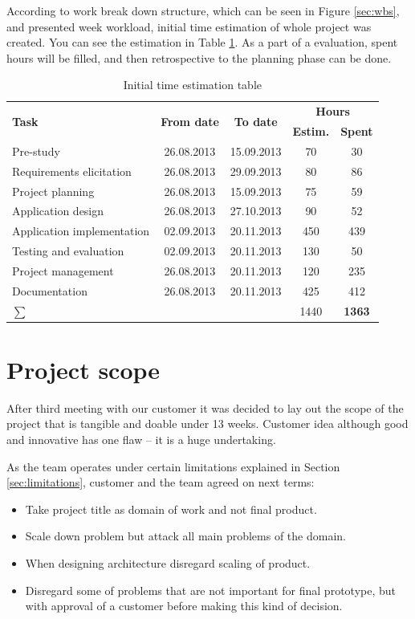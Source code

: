 According to work break down structure, which can be seen in Figure \ref{sec:wbs}, and presented week workload, initial time estimation of whole project was created. 
You can see the estimation in Table \ref{tab:initial-time-estimation}. 
As a part of a evaluation, spent hours will be filled, and then retrospective to the planning phase can be done.

\begin{table}[!h]
	\caption{Initial time estimation table}
	\label{tab:initial-time-estimation}
	\def\arraystretch{1.25}
	\begin{tabularx}{\textwidth}{Xcccc}
		\toprule[0.5mm]
		\multirow{2}{*}{\textbf{Task}} &
		\multirow{2}{*}{\textbf{From date}} & 
		\multirow{2}{*}{\textbf{To date}} & 
		\multicolumn{2}{c}{\textbf{Hours}} \\
 				& & & \textbf{Estim.} & \textbf{Spent} \\
		\midrule
		Pre-study 					& 26.08.2013 & 15.09.2013 & 70 &  30\\
		Requirements elicitation 	& 26.08.2013 & 29.09.2013 & 80 &  86\\
		Project planning			& 26.08.2013 & 15.09.2013 &	75 &  59\\
		Application design 			& 26.08.2013 & 27.10.2013 & 90 &  52\\
		Application implementation	& 02.09.2013 & 20.11.2013 &	450 &  439\\
		Testing and evaluation 		& 02.09.2013 & 20.11.2013 & 130 &	50\\
		Project management  		& 26.08.2013 & 20.11.2013 & 120 &  235\\
		Documentation				& 26.08.2013 & 20.11.2013 &	425 &  412\\
		\midrule		
		\textbf{$\sum$}	& &	&		1440	& \textbf{1363} \\								
		\bottomrule[0.5mm]
	\end{tabularx}
\end{table}


\section{Project scope}
After third meeting with our customer it was decided to lay out the scope of the project that is tangible and doable under 13 weeks. Customer idea although good and innovative has one flaw -- it is a huge undertaking.

As the team operates under certain limitations explained in Section \ref{sec:limitations}, customer and the team agreed on next terms:
\begin{itemize}
	\item Take project title as domain of work and not final product.
	\item Scale down problem but attack all main problems of the domain.
	\item When designing architecture disregard scaling of product.
	\item Disregard some of problems that are not important for final prototype, but with approval of a customer before making this kind of decision.
\end{itemize}

